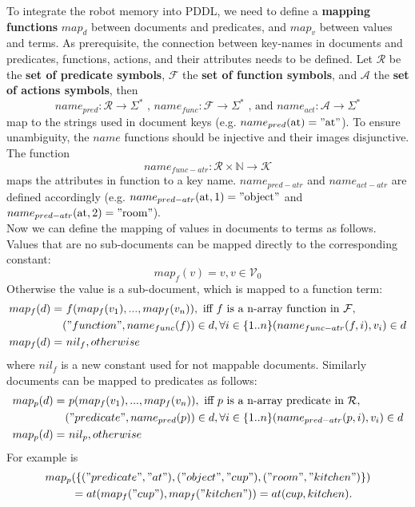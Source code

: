 To integrate the robot memory into PDDL, we need to define a
\textbf{mapping functions} $map_d$ between documents and predicates, and
$map_v$ between values and terms. As prerequisite, the connection
between key-names in documents and predicates, functions, actions, and their
attributes needs to be defined. Let $\mathcal{R}$ be the \textbf{set
  of predicate symbols}, $\mathcal{F}$ the \textbf{set of function
  symbols}, and $\mathcal{A}$ the \textbf{set of actions
  symbols}, then
%
$$name_{pred}: \mathcal{R} \rightarrow \Sigma^*
\text{ , } name_{func}: \mathcal{F} \rightarrow \Sigma^*
\text{ , and } name_{act}: \mathcal{A} \rightarrow \Sigma^*$$
%
map to the strings used in document keys
(e.g. $name_{pred}(\text{at})="\text{at}"$). To ensure unambiguity,
the $name$ functions should
be injective and their images disjunctive. The function
%
$$ name_{func-atr}: \mathcal{R} \times \mathbb{N} \rightarrow
\mathcal{K}$$
%
maps the attributes in function to a key name. $name_{pred-atr}$ and
$name_{act-atr}$ are defined accordingly
(e.g. $name_{pred-atr}(\text{at},1)="\text{object}"$ and
$name_{pred-atr}(\text{at},2)="\text{room}"$).
\\
Now we can define the mapping of values in documents to terms as
follows. Values that are no sub-documents can be mapped directly to
the corresponding constant:
$$map_f(v)=v, v \in \mathcal{V}_0$$
Otherwise the value is a sub-document, which is mapped to a function term:
\begin{align*}
  map_f(d)= &\text{ }f(map_f(v_1), ..., map_f(v_n)), \text{ iff } f \text{ is a n-array function in } \mathcal{F},\\
  &("function", name_{func}(f))\in d,
  \forall i \in \{1..n\} (name_{func-atr}(f,i), v_i)\in d\\
  map_f(d)= &\text{ } nil_f, otherwise\text{~~~~~~~~~~~~~~~}
\end{align*}
where $nil_f$ is a new constant used for not mappable documents.
Similarly documents can be mapped to predicates as follows:
\begin{align*}
  map_p(d)=&\text{ }p(map_f(v_1), ..., map_f(v_n)), \text{ iff } p \text{ is a n-array predicate in } \mathcal{R},\\
  &("predicate", name_{pred}(p))\in d,
  \forall i \in \{1..n\} (name_{pred-atr}(p,i), v_i)\in d\\
  map_p(d)=& \text{ }nil_p, otherwise\text{~~~~~~~~~~~~~~~}
\end{align*}
For example is
\begin{align*}
map_p&(\{("predicate", "at"),("object", "cup"),("room",
"kitchen")\})\\
&= at(map_f("cup"), map_f("kitchen")) = at(cup, kitchen) \text{.}
\end{align*}
